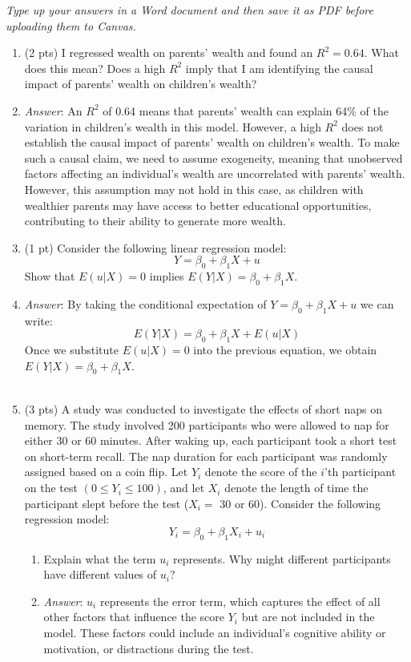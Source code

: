 \documentclass{./../../Latex/handout}
\begin{document}
\thispagestyle{plain}

\textit{Type up your answers in a Word document and then save it as PDF before uploading them to Canvas. 
}

\begin{enumerate}
\item (2 pts) I regressed wealth on parents' wealth and found an $R^2=0.64$. What does this mean? Does a high $R^2$ imply that I am identifying the causal impact of parents' wealth on children's wealth? 
\item[] \textit{Answer}: An $R^2$ of 0.64 means that parents' wealth can explain 64\% of the variation in children's wealth in this model. However, a high $R^2$ does not establish the causal impact of parents' wealth on children's wealth. To make such a causal claim, we need to assume exogeneity, meaning that unobserved factors affecting an individual's wealth are uncorrelated with parents' wealth. However, this assumption may not hold in this case, as children with wealthier parents may have access to better educational opportunities, contributing to their ability to generate more wealth.   \\

\item (1 pt) Consider the following linear regression model:
$$ Y = \beta_0 + \beta_1 X + u $$
Show that $E(u|X)=0$ implies  $E(Y|X) = \beta_0 + \beta_1 X $. 
\item[] \textit{Answer}: By taking the conditional expectation of $Y = \beta_0 + \beta_1 X + u$ we can write:
$$ E(Y|X) = \beta_0 + \beta_1 X + E(u|X) $$
Once we substitute $E(u|X)=0$ into the previous equation, we obtain $E(Y|X) = \beta_0 + \beta_1 X$. \\~\\

\item (3 pts) A study was conducted to investigate the effects of short naps on memory. The study involved 200 participants who were allowed to nap for either 30 or 60 minutes. After waking up, each participant took a short test on short-term recall. The nap duration for each participant was randomly assigned based on a coin flip. Let $Y_i$ denote the score of the $i$'th participant on the test $(0 ≤ Y_i ≤ 100)$, and let $X_i$ denote the length of time the participant slept before the test ($X_i = $ 30 or 60). Consider the following regression model: $$ Y_i = \beta_0 + \beta_1 X_i + u_i $$ 
\begin{enumerate}
  \item Explain what the term $u_i$ represents. Why might different participants have different values of $u_i$?
  \item[] \textit{Answer}: $u_i$ represents the error term, which captures the effect of all other factors that influence the score $Y_i$ but are not included in the model. These factors could include an individual's cognitive ability or motivation, or distractions during the test. 
  

\end{enumerate}
\end{enumerate}
\end{document}
